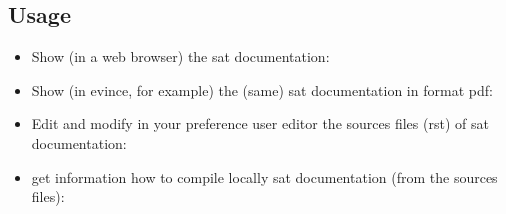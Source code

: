 \documentclass[a4paper,10pt,english]{sphinxmanual}
\begin{document}
\subsection{Usage}
\label{\detokenize{commands/doc:usage}}\begin{itemize}
\item {} 
Show (in a web browser) the sat documentation:

%
\begin{sphinxVerbatim}[commandchars=\\\{\}]
  
\end{sphinxVerbatim}

\item {} 
Show (in evince, for example) the (same) sat documentation in format pdf:

%
\begin{sphinxVerbatim}[commandchars=\\\{\}]
  
\end{sphinxVerbatim}

\item {} 
Edit and modify in your preference user editor the sources files (rst) of sat documentation:

%
\begin{sphinxVerbatim}[commandchars=\\\{\}]
  
\end{sphinxVerbatim}

\item {} 
get information how to compile locally sat documentation (from the sources files):

%
\begin{sphinxVerbatim}[commandchars=\\\{\}]
  
\end{sphinxVerbatim}

\end{itemize}
\end{document}
